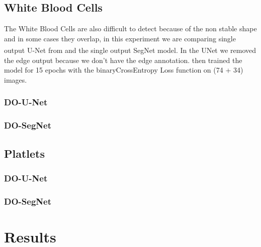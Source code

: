 \subsection{White Blood Cells}
The White Blood Cells are also difficult to detect because of the non stable shape and in some cases they overlap, in this experiment we are comparing single output U-Net from \textsuperscript{\cite{10.1007/978-3-030-44584-3_31}} and the single output SegNet model.
In the UNet we removed the edge output because we don't have the edge annotation. then trained the model for 15 epochs with the binaryCrossEntropy Loss function on (74 + 34) images.

\subsubsection{DO-U-Net}



\subsubsection{DO-SegNet}

% 

\subsection{Platlets}
\subsubsection{DO-U-Net}
\subsubsection{DO-SegNet}

% 


\section{Results}
\vspace{0.2in}
\hspace*{0.16in}



